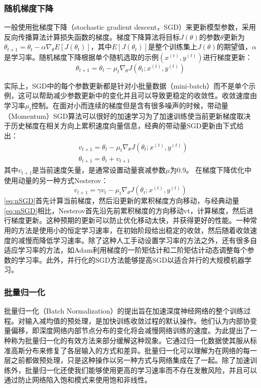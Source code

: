 \subsubsection{随机梯度下降}\label{SGD_optimization}
一般使用批梯度下降（stochastic gradient descent，SGD）来更新模型参数，采用反向传播算法计算损失函数的梯度。梯度下降算法将目标$ J(\theta)$的参数$ \theta $更新为$ \theta_{t + 1} = \theta_t - \alpha \nabla_\theta E [J(\theta_t)] $，其中$ E [J(\theta_t)] $是整个训练集上$ J(\theta)$的期望值，$ \alpha $是学习率。随机梯度下降根据单个随机选取的示例$(x ^ {(t)},y ^ {(t)})$进行梯度更新：
\begin{equation}
\label{eq:SGD}
\theta_{t+1} = \theta_t - \mu_t \nabla_\theta J(\theta_t; x^{(t)},y^{(t)})
\end{equation}

实际上，SGD中的每个参数更新都是针对小批量数据（mini-batch）而不是单个示例，这可以帮助减少参数更新中的变化并且可以导致更稳定的收敛性。收敛速度由学习率$ \mu_t $控制。在面对小而连续的梯度但是含有很多噪声的时候，带动量（Momentum）SGD算法可以很好的加速学习为了加速训练使当前更新梯度取决于历史梯度在相关方向上累积速度向量信息，经典的带动量SGD更新由下式给出：
\begin{equation}    \label{eq:mSGD}
\begin{aligned}
   & v_{t+1} = \theta_t - \mu_t \nabla_\theta J(\theta_t; x^{(t)},y^{(t)})\\
   & \theta_{t+1} = \theta_t +v_{t+1} 
\end{aligned}
\end{equation}
其中$v_{t+1}$是当前速度矢量，是通常设置动量衰减参数$\mu$为0.9。 在梯度下降优化中使用动量的另一种方式Nesterov\cite{Krizhevsky2012}：
\begin{equation}
    \label{eq:nSGD}
    v_{t+1} = \gamma v_t - \mu_t \nabla_\theta J(\theta_t; x^{(t)},y^{(t)})
\end{equation}
\ref{eq:nSGD}首先计算当前梯度，然后沿更新的累积梯度方向移动，与经典动量\ref{eq:mSGD}相比，Nesterov首先沿先前累积梯度的方向移动vt，计算梯度，然后进行梯度更新。这种预期的更新可以防止优化移动太快，并获得更好的性能。一种常用的方法是使用小的恒定学习速率，在初始阶段给出稳定的收敛，然后随着收敛速度的减慢而降低学习速率。除了这种人工手动设置学习率的方法之外，还有很多自适应学习率的方法，如Adam\cite{Kingma2014Adam}利用梯度的一阶矩估计和二阶矩估计动态调整每个参数的学习率。此外，并行化的SGD方法能够提高SGD以适合并行的大规模机器学习。

\subsubsection{批量归一化}
批量归一化（Batch Normalization）\cite{Ioffe2014Batch}的提出旨在加速深度神经网络的整个训练过程。对输入减均值的预处理，是加快训练收敛过程的默认操作。他们认为内部协变量偏移，即深度网络内部节点分布的变化将会减慢网络训练的速度。为此提出了一种称为批量归一化的有效方法来部分缓解这种现象。它通过归一化数据使其服从标准高斯分布来修复了各层输入的方式和差异。批量归一化可以理解为在网络的每一层之前都做预处理，只是这种操作以另一种方式与网络集成在了一起。除了加速训练外，批量归一化还使我们能够使用更高的学习速率而不存在发散风险，并且可以通过防止网络陷入饱和模式来使用饱和非线性。
